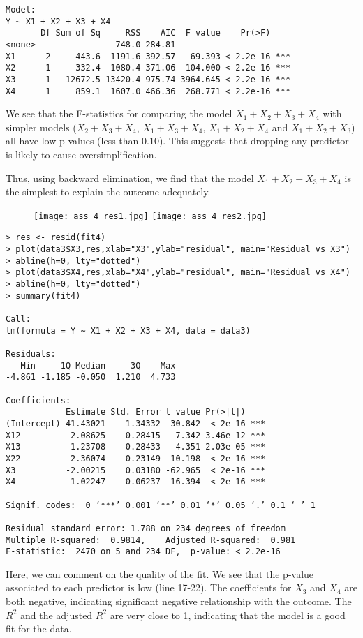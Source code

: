 \documentclass[10pt]{article}
\begin{document}
\begin{enumerate}
\begin{enumerate}[a)]
\begin{lstlisting}
Model:
Y ~ X1 + X2 + X3 + X4
       Df Sum of Sq     RSS    AIC  F value    Pr(>F)    
<none>                748.0 284.81                       
X1      2     443.6  1191.6 392.57   69.393 < 2.2e-16 ***
X2      1     332.4  1080.4 371.06  104.000 < 2.2e-16 ***
X3      1   12672.5 13420.4 975.74 3964.645 < 2.2e-16 ***
X4      1     859.1  1607.0 466.36  268.771 < 2.2e-16 ***
		\end{lstlisting}
		We see that the F-statistics for comparing the model $X_1 + X_2 + X_3 + X_4$ with simpler models ($X_2 + X_3 + X_4$, $X_1 + X_3 + X_4$, $X_1 + X_2 + X_4$ and $X_1 + X_2 + X_3$) all have low p-values (less than 0.10). This suggests that dropping any predictor is likely to cause oversimplification.
		
		Thus, using backward elimination, we find that the model $X_1 + X_2 + X_3 + X_4$ is the simplest to explain the outcome adequately. 
		
		\begin{figure}[ht!]
		\center
		\texttt{[image: ass\_4\_res1.jpg]}
		\texttt{[image: ass\_4\_res2.jpg]}
		\end{figure}
		
		\begin{lstlisting}
> res <- resid(fit4) 
> plot(data3$X3,res,xlab="X3",ylab="residual", main="Residual vs X3")
> abline(h=0, lty="dotted")
> plot(data3$X4,res,xlab="X4",ylab="residual", main="Residual vs X4")
> abline(h=0, lty="dotted")
> summary(fit4)

Call:
lm(formula = Y ~ X1 + X2 + X3 + X4, data = data3)

Residuals:
   Min     1Q Median     3Q    Max 
-4.861 -1.185 -0.050  1.210  4.733 

Coefficients:
            Estimate Std. Error t value Pr(>|t|)    
(Intercept) 41.43021    1.34332  30.842  < 2e-16 ***
X12          2.08625    0.28415   7.342 3.46e-12 ***
X13         -1.23708    0.28433  -4.351 2.03e-05 ***
X22          2.36074    0.23149  10.198  < 2e-16 ***
X3          -2.00215    0.03180 -62.965  < 2e-16 ***
X4          -1.02247    0.06237 -16.394  < 2e-16 ***
---
Signif. codes:  0 ‘***’ 0.001 ‘**’ 0.01 ‘*’ 0.05 ‘.’ 0.1 ‘ ’ 1

Residual standard error: 1.788 on 234 degrees of freedom
Multiple R-squared:  0.9814,    Adjusted R-squared:  0.981 
F-statistic:  2470 on 5 and 234 DF,  p-value: < 2.2e-16

		\end{lstlisting}		
		
		Here, we can comment on the quality of the fit. We see that the p-value associated to each predictor is low (line 17-22). The coefficients for $X_3$ and $X_4$ are both negative, indicating significant negative relationship with the outcome. The $R^2$ and the adjusted $R^2$ are very close to 1, indicating that the model is a good fit for the data. 
		

\end{enumerate}
\end{enumerate}
\end{document}
